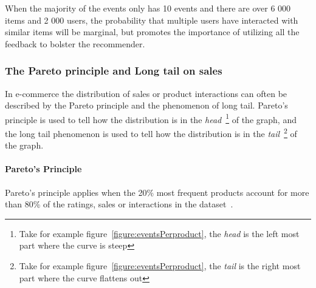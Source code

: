         When the majority of the events only has 10 events and there are over 6 000 items and 2 000 users, the probability that multiple users have interacted with similar items will be marginal, but promotes the importance of utilizing all the feedback to bolster the recommender.

\subsubsection{The Pareto principle and Long tail on sales}
    In e-commerce the distribution of sales or product interactions can often be described by the Pareto principle and the phenomenon of long tail.
    Pareto's principle is used to tell how the distribution is in the \emph{head}~\footnote{Take for example figure~\ref{figure:eventsPerproduct}, the \emph{head} is the left most part where the curve is steep} of the graph, and the long tail phenomenon is used to tell how the distribution is in the \emph{tail}~\footnote{Take for example figure~\ref{figure:eventsPerproduct}, the \emph{tail} is the right most part where the curve flattens out} of the graph.

\paragraph{Pareto's Principle}
    Pareto's principle applies when the 20\% most frequent products account for more than 80\% of the ratings, sales or interactions in the dataset~\cite{newman05power}.

